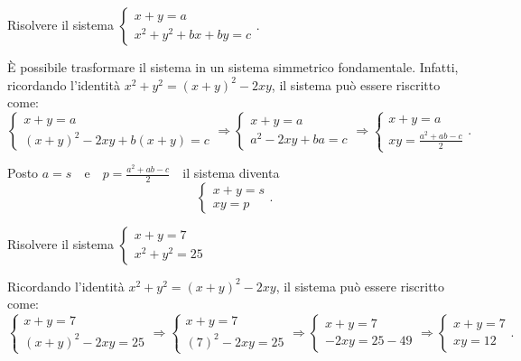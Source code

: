 \begin{exrig}
\begin{esempio}
Risolvere il sistema $\left\{\begin{array}{l}{x+y=a}\\{x^2+y^2+{bx}+{by}=c}\end{array}\right.$.

\`E possibile trasformare il sistema in un sistema simmetrico fondamentale. Infatti, ricordando l'identità $x^2+y^2=(x+y)^2-2{xy}$, il sistema può essere riscritto come: 
\[ \left\{\begin{array}{l}{x+y=a}\\
{(x+y)^2-2{xy}+b(x+y)=c}\end{array}\right.
\Rightarrow \left\{\begin{array}{l}{x+y=a}\\
{a^2-2{xy}+{ba}=c}\end{array}\right.
\Rightarrow \left\{\begin{array}{l}{x+y=a}\\
{{xy}=\frac{a^2+{ab}-c} 2}\end{array}\right..\]

Posto $a=s$~~e~~$p=\frac{a^2+{ab}-c} 2$~~il sistema diventa
\[\left\{\begin{array}{l}{x+y=s}\\{{xy}=p}\end{array}\right..\]
\end{esempio}

\begin{esempio}
Risolvere il sistema $\left\{\begin{array}{l}{x+y=7}\\{x^2+y^2=25}\end{array}\right.$

Ricordando l'identità $x^2+y^2=(x+y)^2-2{xy}$, il sistema può essere riscritto come: 
\[\left\{\begin{array}{l}{x+y=7}\\
{(x+y)^2-2{xy}=25}\end{array}\right.
\Rightarrow \left\{\begin{array}{l}{x+y=7}\\
{(7)^2-2{xy}=25}\end{array}\right.
\Rightarrow \left\{\begin{array}{l}{x+y=7}\\
{-2{xy}=25-49}\end{array}\right.\Rightarrow 
\left\{\begin{array}{l}{x+y=7}\\{{xy}=12}\end{array}\right..\]


\end{esempio}
\end{exrig}
